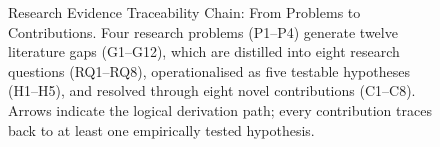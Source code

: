{\begin{figure}[!htbp]
{%
}%
\caption[Research Evidence Traceability Chain]{Research Evidence Traceability Chain: From Problems to Contributions. Four research problems (P1--P4) generate twelve literature gaps (G1--G12), which are distilled into eight research questions (RQ1--RQ8), operationalised as five testable hypotheses (H1--H5), and resolved through eight novel contributions (C1--C8). Arrows indicate the logical derivation path; every contribution traces back to at least one empirically tested hypothesis.}


\label{fig:evidence_traceability}
\end{figure}
}


